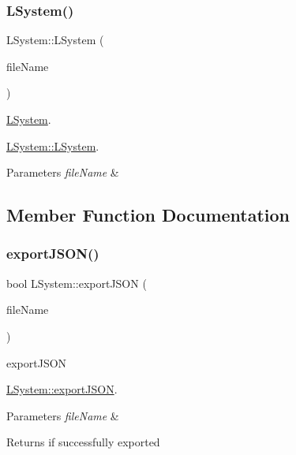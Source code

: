 \subsubsection{\texorpdfstring{L\+System()}{LSystem()}}
{\footnotesize\ttfamily L\+System\+::\+L\+System (\begin{DoxyParamCaption}\item[{Q\+String}]{file\+Name }\end{DoxyParamCaption})}



\hyperlink{classLSystem}{L\+System}. 

\hyperlink{classLSystem_ab867b4862befaaf5032f9d5d7c54d958}{L\+System\+::\+L\+System}.


\begin{DoxyParams}{Parameters}
{\em file\+Name} & \\
\hline
\end{DoxyParams}


\subsection{Member Function Documentation}
\mbox{\label{classLSystem_a6bd4eca47384206c7d54d8971add7766}} 
\subsubsection{\texorpdfstring{export\+J\+S\+O\+N()}{exportJSON()}}
{\footnotesize\ttfamily bool L\+System\+::export\+J\+S\+ON (\begin{DoxyParamCaption}\item[{Q\+String}]{file\+Name }\end{DoxyParamCaption})}



export\+J\+S\+ON 

\hyperlink{classLSystem_a6bd4eca47384206c7d54d8971add7766}{L\+System\+::export\+J\+S\+ON}.


\begin{DoxyParams}{Parameters}
{\em file\+Name} & \\
\hline
\end{DoxyParams}
\begin{DoxyReturn}{Returns}
if successfully exported
\end{DoxyReturn}

